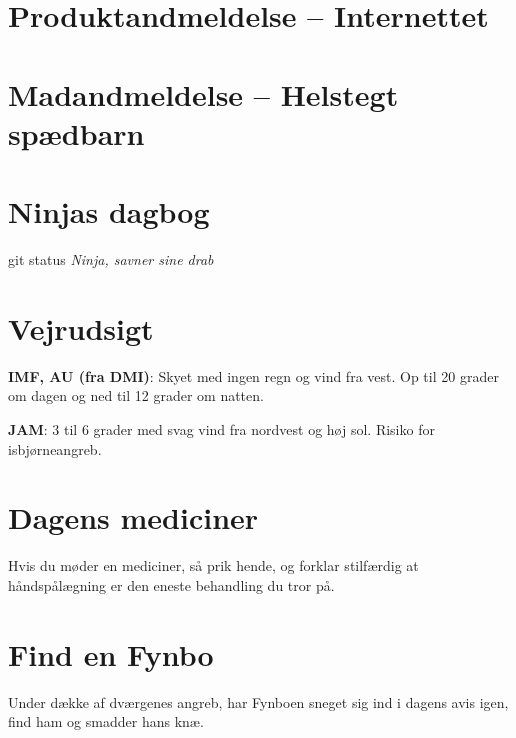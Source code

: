 

\begin{minipage}[b]{0.95\linewidth}
\begin{minipage}[t]{0.47\textwidth}
\vspace{3mm}
\section*{Produktandmeldelse -- Internettet}


\vspace{1mm}
\section*{Madandmeldelse -- Helstegt spædbarn}
\vspace{2mm}

\section*{Ninjas dagbog}
git status
{\flushright\emph{Ninja, savner sine drab}}

\end{minipage}%
\hfill\begin{minipage}[t]{0.47\textwidth}
\vspace{3mm}
\section*{Vejrudsigt}
\textbf{IMF, AU (fra DMI)}: Skyet med ingen regn og vind fra vest. Op til 20 grader om dagen og ned til 12 grader om natten.

\textbf{JAM}: 3 til 6 grader med svag vind fra nordvest og høj sol. Risiko for isbjørneangreb.

\vspace{-2mm}
\section*{Dagens mediciner}
Hvis du møder en mediciner, så prik hende, og forklar stilfærdig at håndspålægning er den eneste behandling du tror på.

\vspace{-2mm}
\section*{Find en Fynbo}
Under dække af dværgenes angreb, har Fynboen sneget sig ind i dagens avis igen, find ham og smadder hans knæ.


\end{minipage}
\end{minipage}
